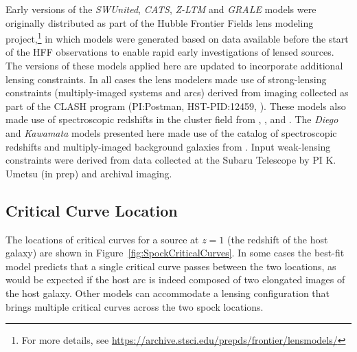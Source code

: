 Early versions of the {\it SWUnited}, {\it CATS}, {\it Z-LTM} and {\it
  GRALE} models were originally distributed as part of the Hubble
Frontier Fields lens modeling project,\footnote{For more details, see
  \url{https://archive.stsci.edu/prepds/frontier/lensmodels/}} in
which models were generated based on data available before the start
of the HFF observations to enable rapid early investigations of lensed
sources. The versions of these models applied here are updated to
incorporate additional lensing constraints.  In all cases the lens
modelers made use of strong-lensing constraints (multiply-imaged
systems and arcs) derived from \HST imaging collected as part of the
CLASH program (PI:Postman, HST-PID:12459,
\citealt{Postman:2012}). These models also made use of spectroscopic
redshifts in the cluster field from \citet{Mann:2012},
\citet{Christensen:2012}, and \citet{Grillo:2015a}.  The {\it Diego}
and {\it Kawamata} models presented here made use of the catalog of
spectroscopic redshifts and multiply-imaged background galaxies from
\citet{Caminha:2017}.  Input weak-lensing constraints were derived
from data collected at the Subaru Telescope by PI K. Umetsu (in prep)
and archival imaging.

\subsection{Critical Curve Location}\label{sec:CriticalCurveLocation}

The locations of critical curves for a source at $z=1$ (the redshift
of the \spock host galaxy) are shown in
Figure~\ref{fig:SpockCriticalCurves}. In some cases the best-fit model
predicts that a single critical curve passes between the two \spock
locations, as would be expected if the host arc is indeed composed of
two elongated images of the host galaxy. Other models can accommodate
a lensing configuration that brings multiple critical curves across
the two spock locations.

